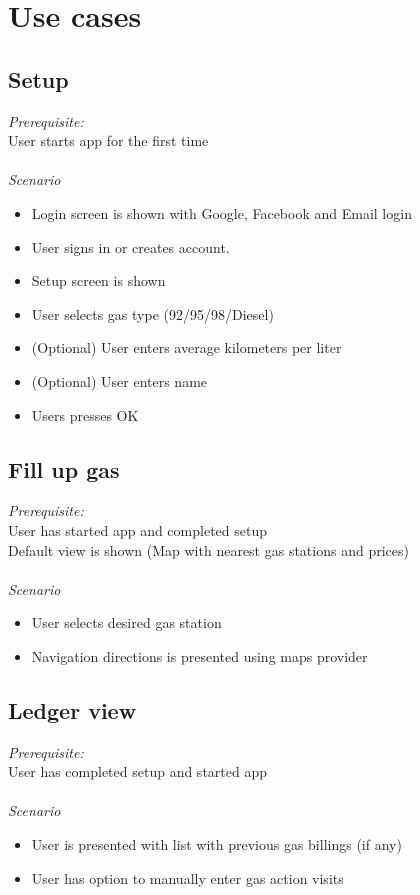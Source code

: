 
\chapter{Use cases}

\section{Setup}
\emph{Prerequisite:}\\
User starts app for the first time\\
\\
\emph{Scenario}
\begin{itemize}
	\item Login screen is shown with Google, Facebook and Email login
	\item User signs in or creates account.
	\item Setup screen is shown
	\item User selects gas type (92/95/98/Diesel)
	\item (Optional) User enters average kilometers per liter
	\item (Optional) User enters name
	\item Users presses OK
\end{itemize}

\section{Fill up gas}
\emph{Prerequisite:}\\
User has started app and completed setup\\
Default view is shown (Map with nearest gas stations and prices)\\
\\
\emph{Scenario}
\begin{itemize}
\item User selects desired gas station
\item Navigation  directions is presented using maps provider
\end{itemize}

\section{Ledger view}
\emph{Prerequisite:}\\
User has completed setup and started app\\
\\
\emph{Scenario}
\begin{itemize}
	\item User is presented with list with previous gas billings (if any)
	\item User has option to manually enter gas action visits
\end{itemize}

